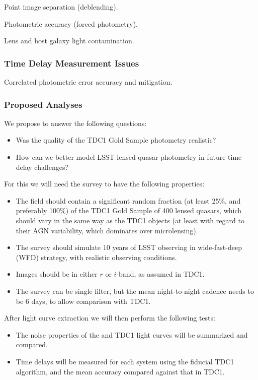 Point image separation (deblending).

Photometric accuracy (forced photometry).

Lens and host galaxy light contamination.



\subsubsection{Time Delay Measurement Issues}
\label{sec:twinkles1:science:stronglensing:timedelay}

Correlated photometric error accuracy and mitigation.



\subsubsection{Proposed Analyses}
\label{sec:twinkles1:science:stronglensing:analyses}

We propose to answer the following questions:
\begin{itemize}
\item Was the quality of the TDC1 Gold Sample photometry realistic?
\item How can we better model LSST lensed quasar photometry in future time delay challenges?
\end{itemize}

For this we will need the \TwinklesOne survey to have the following
properties:
\begin{itemize}
\item The field should contain a significant random fraction (at least
25\%,  and preferably 100\%) of the TDC1 Gold Sample of 400 lensed
quasars,  which should vary in the same way as the TDC1 objects (at
least with regard to their  AGN variability, which dominates over
microlensing).
\item The survey should simulate 10 years of LSST observing in
wide-fast-deep (WFD) strategy, with realistic observing conditions.
\item Images should be in either $r$ or $i$-band, as assumed in TDC1.
\item The survey can be single filter, but the mean night-to-night
cadence needs to be 6 days, to allow comparison with TDC1.
\end{itemize}

After light curve extraction we will then perform the following tests:
\begin{itemize}
\item The noise properties of the \TwinklesOne and TDC1 light curves
will be summarized and compared.
\item Time delays will be measured for each system using the fiducial
TDC1 algorithm, and the mean accuracy compared against that in TDC1.
\end{itemize}


